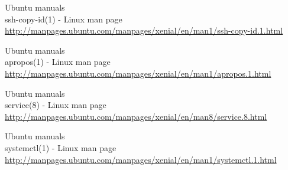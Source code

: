 \begin{thebibliography}{10}
Ubuntu manuals\\
ssh-copy-id(1) - Linux man page\\
  \url{http://manpages.ubuntu.com/manpages/xenial/en/man1/ssh-copy-id.1.html}

Ubuntu manuals\\
apropos(1) - Linux man page\\
  \url{http://manpages.ubuntu.com/manpages/xenial/en/man1/apropos.1.html}

Ubuntu manuals\\
service(8) - Linux man page\\
  \url{http://manpages.ubuntu.com/manpages/xenial/en/man8/service.8.html}

Ubuntu manuals\\
systemctl(1) - Linux man page\\
  \url{http://manpages.ubuntu.com/manpages/xenial/en/man1/systemctl.1.html}

\end{thebibliography}
